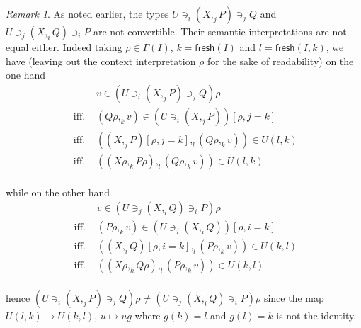 \documentclass[english]{PaperTools/latex/entcs}
\theoremstyle{plain}
\theoremstyle{definition}
\theoremstyle{remark}
\newtheorem*{remark}{Remark}
\newcommand\op[1]{∋_{#1}}
\def\fresh#1{\mathsf{fresh}(#1)}
\begin{document}
\begin{remark}
  As noted earlier, the types
  $U \op i (X ,_j P) \op j Q$ and $U \op j (X ,_i Q) \op i P$
  are not convertible.
  Their semantic interpretations are not equal either.  Indeed
  taking $ρ ∈ Γ(I)$, $k = \fresh{I}$ and $l = \fresh{I,k}$,
  we have
  (leaving out the context interpretation $ρ$ for the sake of
  readability)
  on the one hand\\[-1.5\baselineskip]%
  \begin{align*}
    &v ∈ (U \op i (X ,_j P) \op j Q) ρ
    \\
    \text{ iff. }& (Qρ ,_k v) ∈ (U \op i (X ,_j P))[ρ,j=k]
    \\
    \text{ iff. }& ((X ,_j P)[ρ,j=k] ,_l (Qρ ,_k v)) ∈ U(l,k)
    \\
    \text{ iff. }& ((Xρ ,_k Pρ) ,_l (Qρ ,_k v)) ∈ U(l,k)
  \end{align*}\\[-1.5\baselineskip]%
  while on the other hand\\[-1.5\baselineskip]%
  \begin{align*}
    &v ∈ (U \op j (X ,_i Q) \op i P) ρ
    \\
    \text{ iff. }& (Pρ ,_k v) ∈ (U \op j (X ,_i Q))[ρ,i=k]
    \\
    \text{ iff. }& ((X ,_i Q)[ρ,i=k] ,_l (Pρ ,_k v)) ∈ U(k,l)
    \\
    \text{ iff. }& ((Xρ ,_k Qρ) ,_l (Pρ ,_k v)) ∈ U(k,l)
  \end{align*}\\[-1.5\baselineskip]%
  hence $(U \op i (X ,_j P) \op j Q) ρ ≠ (U \op j (X ,_i Q) \op i P) ρ$
  since the map $U(l,k) → U(k,l)$, $u ↦ ug$ where $g(k) = l$ and $g(l)=k$
  is not the identity.
\end{remark}
\end{document}
